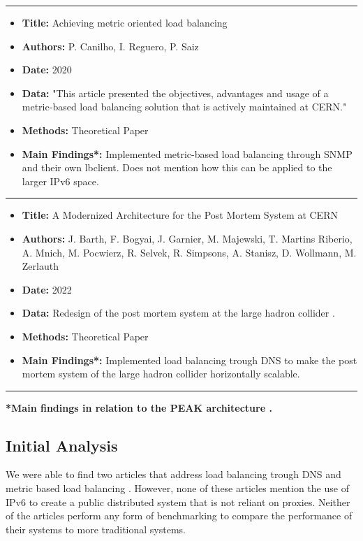 \documentclass[12pt]{article}
\begin{document}
\newpage

\noindent\rule{\textwidth}{0.4pt}
\begin{itemize}
    \item \textbf{Title:} Achieving metric oriented load balancing \cite{canilhoAchievingMetricOriented2020}
    \item \textbf{Authors:} P. Canilho, I. Reguero, P. Saiz
    \item \textbf{Date:} 2020
    \item \textbf{Data:} "This article presented the objectives, advantages and usage of a metric-based load balancing solution that is actively maintained at CERN." \cite{canilhoAchievingMetricOriented2020}
    \item \textbf{Methods:} Theoretical Paper
    \item \textbf{Main Findings*:} Implemented metric-based load balancing through SNMP and their own lbclient. Does not mention how this can be applied to the larger IPv6 space.
\end{itemize}
\noindent\rule{\textwidth}{0.4pt}
\begin{itemize}
    \item \textbf{Title:} A Modernized Architecture for the Post Mortem System at CERN \cite{barthModernizedArchitecturePost2022}
    \item \textbf{Authors:} J. Barth, F. Bogyai, J. Garnier, M. Majewski, T. Martins Riberio, A. Mnich, M. Pocwierz, R. Selvek, R. Simpsons, A. Stanisz, D. Wollmann, M. Zerlauth
    \item \textbf{Date:} 2022
    \item \textbf{Data:} Redesign of the post mortem system at the large hadron collider \cite{barthModernizedArchitecturePost2022}.
    \item \textbf{Methods:} Theoretical Paper
    \item \textbf{Main Findings*:} Implemented load balancing trough DNS to make the post mortem system of the large hadron collider horizontally scalable.
\end{itemize}
\noindent\rule{\textwidth}{0.4pt}
\textbf{*Main findings in relation to the PEAK architecture \cite{heimonenPreprintPEAKProxy}.}

\subsection{Initial Analysis}
We were able to find two articles that address load balancing trough DNS and metric based load balancing \cite{heimonenPeakDNS2024}. 
However, none of these articles mention the use of IPv6 to create a public distributed system that is not reliant on proxies.
Neither of the articles perform any form of benchmarking to compare the performance of their systems to more traditional systems.
\end{document}
